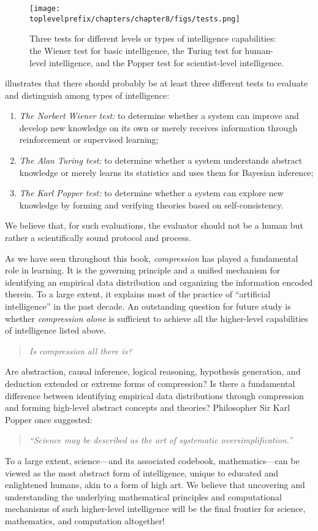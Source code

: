 \documentclass[../../book-main.tex]{subfiles}
\begin{document}
\begin{figure}[t]
    \centering
    \texttt{[image: \\toplevelprefix/chapters/chapter8/figs/tests.png]}
    \caption{Three tests for different levels or types of intelligence capabilities: the Wiener test for basic intelligence, the Turing test for human-level intelligence, and the Popper test for scientist-level intelligence.}
    \label{fig:three-tests}
\end{figure}

 illustrates that there should probably be at least three different tests to evaluate and distinguish among types of intelligence:
\begin{enumerate}
    \item \textit{The Norbert Wiener test:} to determine whether a system can improve and develop new knowledge on its own or merely receives information through reinforcement or supervised learning;
    \item \textit{The Alan Turing test:} to determine whether a system understands abstract knowledge or merely learns its statistics and uses them for Bayesian inference;
    \item \textit{The Karl Popper test:} to determine whether a system can explore new knowledge by forming and verifying theories based on self-consistency.
\end{enumerate}
We believe that, for such evaluations, the evaluator should not be a human but rather a scientifically sound protocol and process.

As we have seen throughout this book, \textit{compression} has played a fundamental role in learning. It is the governing principle and a unified mechanism for identifying an empirical data distribution and organizing the information encoded therein. To a large extent, it explains most of the practice of ``artificial intelligence'' in the past decade. An outstanding question for future study is whether \textit{compression alone} is sufficient to achieve all the higher-level capabilities of intelligence listed above. 
\begin{quote}
    \centering
    \textit{Is compression all there is?}
\end{quote}
Are abstraction, causal inference, logical reasoning, hypothesis generation, and deduction extended or extreme forms of compression? Is there a fundamental difference between identifying empirical data distributions through compression and forming high-level abstract concepts and theories? Philosopher Sir Karl Popper once suggested:
\begin{quote}
    \centering
    \textit{``Science may be described as the art of systematic oversimplification.''}
\end{quote}
To a large extent, science---and its associated codebook, mathematics---can be viewed as the most abstract form of intelligence, unique to educated and enlightened humans, akin to a form of high art. We believe that uncovering and understanding the underlying mathematical principles and computational mechanisms of such higher-level intelligence will be the final frontier for science, mathematics, and computation altogether!
\end{document}
